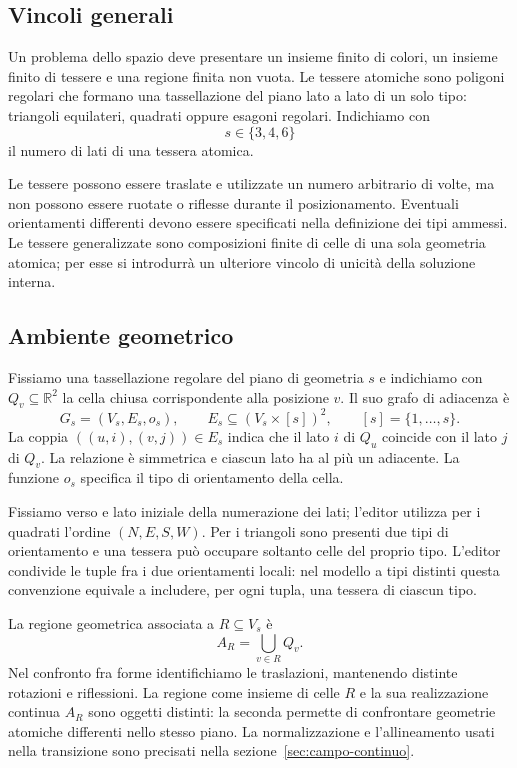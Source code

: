 \documentclass[11pt,a4paper]{article}
\begin{document}
\subsection{Vincoli generali}

Un problema dello spazio deve presentare un insieme finito di colori, un insieme finito di tessere e una regione finita non vuota. Le tessere atomiche sono poligoni regolari che formano una tassellazione del piano lato a lato di un solo tipo: triangoli equilateri, quadrati oppure esagoni regolari. Indichiamo con
\[
s\in\{3,4,6\}
\]
il numero di lati di una tessera atomica.

Le tessere possono essere traslate e utilizzate un numero arbitrario di volte, ma non possono essere ruotate o riflesse durante il posizionamento. Eventuali orientamenti differenti devono essere specificati nella definizione dei tipi ammessi. Le tessere generalizzate sono composizioni finite di celle di una sola geometria atomica; per esse si introdurrà un ulteriore vincolo di unicità della soluzione interna.

\subsection{Ambiente geometrico}

Fissiamo una tassellazione regolare del piano di geometria $s$ e indichiamo con $Q_v\subseteq\mathbb R^2$ la cella chiusa corrispondente alla posizione $v$. Il suo grafo di adiacenza è
\[
G_s=(V_s,E_s,o_s),
\qquad E_s\subseteq(V_s\times[s])^2,
\qquad [s]=\{1,\ldots,s\}.
\]
La coppia $((u,i),(v,j))\in E_s$ indica che il lato $i$ di $Q_u$ coincide con il lato $j$ di $Q_v$. La relazione è simmetrica e ciascun lato ha al più un adiacente. La funzione $o_s$ specifica il tipo di orientamento della cella.

Fissiamo verso e lato iniziale della numerazione dei lati; l'editor utilizza per i quadrati l'ordine $(N,E,S,W)$. Per i triangoli sono presenti due tipi di orientamento e una tessera può occupare soltanto celle del proprio tipo. L'editor condivide le tuple fra i due orientamenti locali: nel modello a tipi distinti questa convenzione equivale a includere, per ogni tupla, una tessera di ciascun tipo.

La regione geometrica associata a $R\subseteq V_s$ è
\[
A_R=\bigcup_{v\in R}Q_v.
\]
Nel confronto fra forme identifichiamo le traslazioni, mantenendo distinte rotazioni e riflessioni. La regione come insieme di celle $R$ e la sua realizzazione continua $A_R$ sono oggetti distinti: la seconda permette di confrontare geometrie atomiche differenti nello stesso piano. La normalizzazione e l'allineamento usati nella transizione sono precisati nella sezione~\ref{sec:campo-continuo}.
\end{document}
